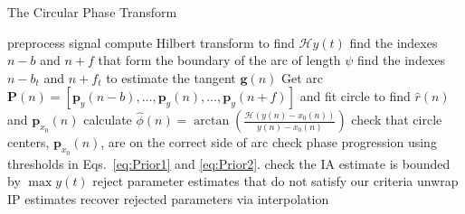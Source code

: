 \documentclass[a4paper]{IEEEtran}
\begin{document}
% 

\begin{algorithm}
\caption{The Circular Phase Transform}\label{CPTAlgorithm}
\begin{algorithmic}[1]
\State preprocess signal
\State compute Hilbert transform to find $\mathcal{H}y(t)$
	\State find the indexes $n-b$ and $n+f$ that form the boundary of the arc of length $\psi$
	\State find the indexes $n-b_t$ and $n+f_t$ to estimate the tangent $\mathbf{g}(n)$
	\State Get arc $\mathbf{P}(n)=[\mathbf{p}_y(n-b),\hdots,\mathbf{p}_y(n),\hdots,\mathbf{p}_y(n+f)]$ and fit circle to find $\hat{r}(n)$ and $\mathbf{p}_{x_0}(n)$
	\State calculate $\hat\phi(n)=\arctan\left(\frac{\mathcal{H}(y(n)-x_0(n))}{y(n)-x_0(n)}\right)$
\EndFor
\State check that circle centers, $\mathbf{p}_{x_0}(n)$, are on the correct side of arc
\State check phase progression using thresholds in Eqs.~\ref{eq:Prior1} and \ref{eq:Prior2}.
\State check the IA estimate is bounded by $\max y(t)$
\State reject parameter estimates that do not satisfy our criteria
\State unwrap IP estimates
\State recover rejected parameters via interpolation 
\end{algorithmic}
\end{algorithm}	
\end{document}
